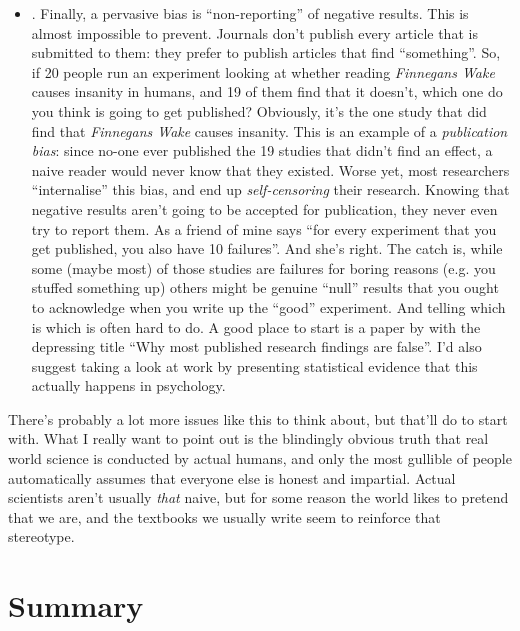 \begin{itemize}
\item {}. Finally, a pervasive bias is ``non-reporting'' of negative results. This is almost impossible to prevent. Journals don't publish every article that is submitted to them: they prefer to publish articles that find ``something''. So, if 20 people run an experiment looking at whether reading {\it Finnegans Wake} causes insanity in humans, and 19 of them find that it doesn't, which one do you think is going to get published? Obviously, it's the one study that did find that {\it Finnegans Wake} causes insanity. This is an example of a {\it publication bias}: since no-one ever published the 19 studies that didn't find an effect, a naive reader would never know that they existed. Worse yet, most researchers ``internalise'' this bias, and end up {\it self-censoring} their research. Knowing that negative results aren't going to be accepted for publication, they never even try to report them. As a friend of mine says ``for every experiment that you get published, you also have 10 failures''. And she's right. The catch is, while some (maybe most) of those studies are failures for boring reasons (e.g. you stuffed something up) others might be genuine ``null'' results that you ought to acknowledge when you write up the ``good'' experiment. And telling which is which is often hard to do. A good place to start is a paper by \textcite{Ioannidis2005} with the depressing title ``Why most published research findings are false''. I'd also suggest taking a look at work by \textcite{Kuhberger2014} presenting statistical evidence that this actually happens in psychology.
\end{itemize}


\noindent
There's probably a lot more issues like this to think about, but that'll do to start with. What I really want to point out is the blindingly obvious truth that real world science is conducted by actual humans, and only the most gullible of people automatically assumes that everyone else is honest and impartial. Actual scientists aren't usually {\it that} naive, but for some reason the world likes to pretend that we are, and the textbooks we usually write seem to reinforce that stereotype.

\section{Summary}

